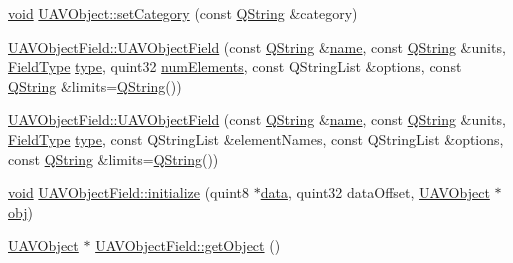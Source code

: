 \begin{DoxyCompactItemize}
\item 
\hyperlink{group___u_a_v_objects_plugin_ga444cf2ff3f0ecbe028adce838d373f5c}{void} \hyperlink{group___u_a_v_objects_plugin_gac1d47f2428a0939dbe9544b6c6add6b5}{U\-A\-V\-Object\-::set\-Category} (const \hyperlink{group___u_a_v_objects_plugin_gab9d252f49c333c94a72f97ce3105a32d}{Q\-String} \&category)
\item 
\hyperlink{group___u_a_v_objects_plugin_ga6ebca8c11d33d2984ef111420988e11d}{U\-A\-V\-Object\-Field\-::\-U\-A\-V\-Object\-Field} (const \hyperlink{group___u_a_v_objects_plugin_gab9d252f49c333c94a72f97ce3105a32d}{Q\-String} \&\hyperlink{glext_8h_ad977737dfc9a274a62741b9500c49a32}{name}, const \hyperlink{group___u_a_v_objects_plugin_gab9d252f49c333c94a72f97ce3105a32d}{Q\-String} \&units, \hyperlink{uavobjectparser_8h_aa01498a3ceb2fa74dc9536c16caef1da}{Field\-Type} \hyperlink{glext_8h_a7d05960f4f1c1b11f3177dc963a45d86}{type}, quint32 \hyperlink{uavobjecttemplate_8m_a5091f26d230c839edecd7245ab426bd6}{num\-Elements}, const Q\-String\-List \&options, const \hyperlink{group___u_a_v_objects_plugin_gab9d252f49c333c94a72f97ce3105a32d}{Q\-String} \&limits=\hyperlink{group___u_a_v_objects_plugin_gab9d252f49c333c94a72f97ce3105a32d}{Q\-String}())
\item 
\hyperlink{group___u_a_v_objects_plugin_ga9e178e25087b21a817679f18f3be1fa0}{U\-A\-V\-Object\-Field\-::\-U\-A\-V\-Object\-Field} (const \hyperlink{group___u_a_v_objects_plugin_gab9d252f49c333c94a72f97ce3105a32d}{Q\-String} \&\hyperlink{glext_8h_ad977737dfc9a274a62741b9500c49a32}{name}, const \hyperlink{group___u_a_v_objects_plugin_gab9d252f49c333c94a72f97ce3105a32d}{Q\-String} \&units, \hyperlink{uavobjectparser_8h_aa01498a3ceb2fa74dc9536c16caef1da}{Field\-Type} \hyperlink{glext_8h_a7d05960f4f1c1b11f3177dc963a45d86}{type}, const Q\-String\-List \&element\-Names, const Q\-String\-List \&options, const \hyperlink{group___u_a_v_objects_plugin_gab9d252f49c333c94a72f97ce3105a32d}{Q\-String} \&limits=\hyperlink{group___u_a_v_objects_plugin_gab9d252f49c333c94a72f97ce3105a32d}{Q\-String}())
\item 
\hyperlink{group___u_a_v_objects_plugin_ga444cf2ff3f0ecbe028adce838d373f5c}{void} \hyperlink{group___u_a_v_objects_plugin_ga76826ee85ebb06f48a3afb3cc7a1c839}{U\-A\-V\-Object\-Field\-::initialize} (quint8 $\ast$\hyperlink{glext_8h_a8850df0785e6fbcc2351af3b686b8c7a}{data}, quint32 data\-Offset, \hyperlink{class_u_a_v_object}{U\-A\-V\-Object} $\ast$\hyperlink{glext_8h_a0c0d4701a6c89f4f7f0640715d27ab26}{obj})
\item 
\hyperlink{class_u_a_v_object}{U\-A\-V\-Object} $\ast$ \hyperlink{group___u_a_v_objects_plugin_ga9a3e58eb1d96fbb375c9e28f870ae1d3}{U\-A\-V\-Object\-Field\-::get\-Object} ()

\end{DoxyCompactItemize}
